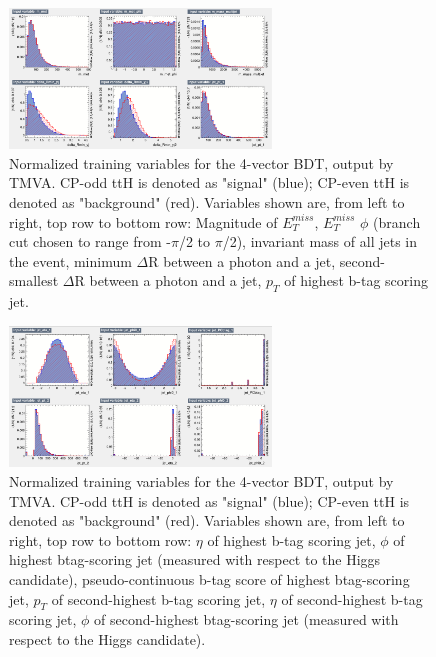 \begin{figure}[htbp]
  \centering
  \includegraphics[width=0.62\textwidth]{figures/TMVABDTStudies/lep-vbls4vec/lep4vecvbls2.png}
  \caption{Normalized training variables for the 4-vector BDT, output by TMVA. CP-odd ttH is denoted as "signal" (blue); CP-even ttH is denoted as "background" (red). Variables shown are, from left to right, top row to bottom row: Magnitude of $E_T^{miss}$, $E_T^{miss}$ $\phi$ (branch cut chosen to range from -$\pi$/2 to $\pi$/2), invariant mass of all jets in the event, minimum $\Delta$R between a photon and a jet, second-smallest $\Delta$R between a photon and a jet, $p_{T}$ of highest b-tag scoring jet.}
  \label{fig:lep4vecvbls2}
\end{figure}

\begin{figure}[htbp]
  \centering
  \includegraphics[width=0.62\textwidth]{figures/TMVABDTStudies/lep-vbls4vec/lep4vecvbls3.png}
  \caption{Normalized training variables for the 4-vector BDT, output by TMVA. CP-odd ttH is denoted as "signal" (blue); CP-even ttH is denoted as "background" (red). Variables shown are, from left to right, top row to bottom row: $\eta$ of highest b-tag scoring jet, $\phi$ of highest btag-scoring jet (measured with respect to the Higgs candidate), pseudo-continuous b-tag score of highest btag-scoring jet, $p_{T}$ of second-highest b-tag scoring jet, $\eta$ of second-highest b-tag scoring jet, $\phi$ of second-highest btag-scoring jet (measured with respect to the Higgs candidate).}
  \label{fig:lep4vecvbls3}
\end{figure}

